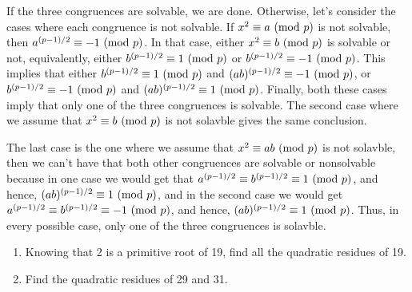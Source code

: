 \begin{solution}
    If the three congruences are solvable, we are done. Otherwise, let's consider the cases where each congruence is not solvable. If $x^2 \equiv a \ (\mathrm{mod}\ p)$ is not solvable, then $a^{(p-1)/2} \equiv -1 \ (\mathrm{mod}\ p)$. In that case, either $x^2 \equiv b \ (\mathrm{mod}\ p)$ is solvable or not, equivalently, either $b^{(p-1)/2} \equiv 1 \ (\mathrm{mod}\ p)$ or $b^{(p-1)/2} \equiv -1 \ (\mathrm{mod}\ p)$. This implies that either $b^{(p-1)/2} \equiv 1 \ (\mathrm{mod}\ p)$ and $(ab)^{(p-1)/2} \equiv -1 \ (\mathrm{mod}\ p)$, or $b^{(p-1)/2} \equiv -1 \ (\mathrm{mod}\ p)$ and $(ab)^{(p-1)/2} \equiv 1 \ (\mathrm{mod}\ p)$. Finally, both these cases imply that only one of the three congruences is solvable. The second case where we assume that $x^2 \equiv b \ (\mathrm{mod}\ p)$ is not solavble gives the same conclusion.
    
    The last case is the one where we assume that $x^2 \equiv ab \ (\mathrm{mod}\ p)$ is not solavble, then we can't have that both other congruences are solvable or nonsolvable because in one case we would get that $a^{(p-1)/2} \equiv b^{(p-1)/2} \equiv 1 \ (\mathrm{mod}\ p)$, and hence, $(ab)^{(p-1)/2} \equiv 1 \ (\mathrm{mod}\ p)$, and in the second case we would get $a^{(p-1)/2} \equiv b^{(p-1)/2} \equiv -1 \ (\mathrm{mod}\ p)$, and hence, $(ab)^{(p-1)/2} \equiv 1 \ (\mathrm{mod}\ p)$. Thus, in every possible case, only one of the three congruences is solavble. \\
\end{solution}

\begin{exercise}
    \begin{enumerate}
        \item Knowing that 2 is a primitive root of 19, find all the quadratic residues of 19.  
        \item Find the quadratic residues of 29 and 31. \\
    \end{enumerate}
\end{exercise}


